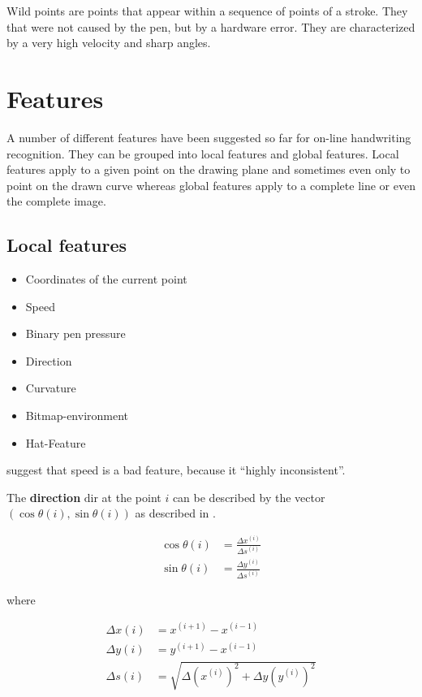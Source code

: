 Wild points are points that appear within a sequence of points of a stroke. They
that were not caused by the pen, but by a hardware error. They are characterized
by a very high velocity and sharp angles.

\section{Features}\label{sec:features}
A number of different features have been suggested so far for on-line handwriting
recognition. They can be grouped into local features and global features.
Local features apply to a given point on the drawing plane and sometimes even
only to point on the drawn curve whereas global features apply to a complete
line or even the complete image.

\subsection{Local features}
\begin{itemize}
    \item Coordinates of the current point\cite{Guyon91}
    \item Speed\cite{Huang09,ICASSP-94}
    \item Binary pen pressure\cite{Kosmala98,Kosmala11,ICASSP-94}
    \item Direction\cite{Manke95,Huang06}
    \item Curvature\cite{Groner66,Manke95,ICASSP-94,Guyon91}
    \item Bitmap-environment\cite{Manke95}
    \item Hat-Feature\cite{ICASSP-94,Manke00}
\end{itemize}

\cite{Kosmala98,Kosmala11} suggest that speed is a bad feature, because it \enquote{highly inconsistent}.

The \textbf{direction} $\text{dir}$ at the point $i$ can be described by the vector 
$(\cos \theta(i), \sin \theta(i))$ as described in \cite{Guyon91}.

\begin{align}
    \cos \theta(i) &= \frac{\Delta x^{(i)}}{\Delta s^{(i)}}\\
    \sin \theta(i) &= \frac{\Delta y^{(i)}}{\Delta s^{(i)}}
\end{align}

where

\begin{align}
    \Delta x (i) &= x^{(i+1)} - x^{(i-1)}\\
    \Delta y (i) &= y^{(i+1)} - x^{(i-1)}\\
    \Delta s (i) &= \sqrt{\Delta (x^{(i)})^2 + \Delta y (y^{(i)})^2}
\end{align}

